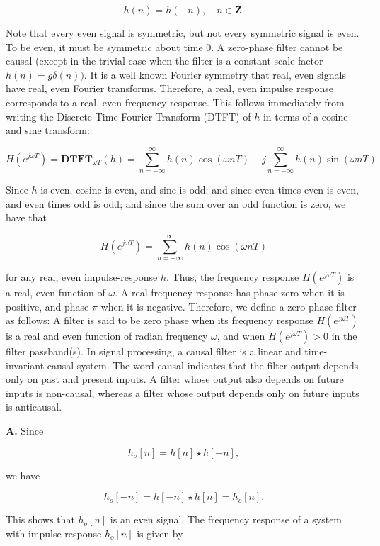 \documentclass[main.tex]{subfiles}
\begin{document}
\begin{enumerate}
\begin{enumerate}
        $$
        h(n)=h(-n), \quad n \in \mathbf{Z}.
        $$

        Note that every even signal is symmetric, but not every symmetric signal is even. To be even, it must be symmetric about time 0. A zero-phase filter cannot be causal (except in the trivial case when the filter is a constant scale factor $h(n)=g \delta(n))$. It is a well known Fourier symmetry that real, even signals have real, even Fourier transforms. Therefore, a real, even impulse response corresponds to a real, even frequency response. This follows immediately from writing the Discrete Time Fourier Transform (DTFT) of $h$ in terms of a cosine and sine transform:
        
        $$
        H\left(e^{j \omega T}\right)=\mathbf{D T F T}_{\omega T}(h)=\sum_{n=-\infty}^{\infty} h(n) \cos (\omega n T)-j \sum_{n=-\infty}^{\infty} h(n) \sin (\omega n T)
        $$
        
        Since $h$ is even, cosine is even, and sine is odd; and since even times even is even, and even times odd is odd; and since the sum over an odd function is zero, we have that
        
        $$
        H\left(e^{j \omega T}\right)=\sum_{n=-\infty}^{\infty} h(n) \cos (\omega n T)
        $$
        
        for any real, even impulse-response $h$. Thus, the frequency response $H\left(e^{j \omega T}\right)$ is a real, even function of $\omega$. A real frequency response has phase zero when it is positive, and phase $\pi$ when it is negative. Therefore, we define a zero-phase filter as follows: A filter is said to be zero phase when its frequency response $H\left(e^{j \omega T}\right)$ is a real and even function of radian frequency $\omega$, and when $H\left(e^{j \omega T}\right)>0$ in the filter passband(s). In signal processing, a causal filter is a linear and time-invariant causal system. The word causal indicates that the filter output depends only on past and present inputs. A filter whose output also depends on future inputs is non-causal, whereas a filter whose output depends only on future inputs is anticausal.

        \textbf{A.} Since 

        $$
        h_o[n]=h[n] \star h[-n],
        $$
        
        we have 
        
        $$
        h_o[-n]=h[-n] \star h[n]=h_o[n].
        $$
        
        This shows that $h_o[n]$ is an even signal. The frequency response of a system with impulse response $h_o[n]$ is given by 
        

\end{enumerate}
\end{enumerate}
\end{document}
